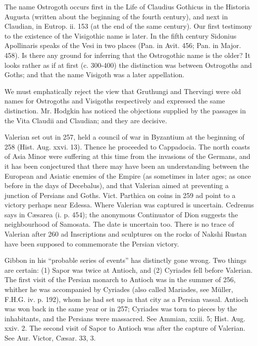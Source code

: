 The name Ostrogoth occurs first in the Life of Claudius Gothicus in the Historia Augusta (written about the beginning of the fourth century), and next in Claudian, in Eutrop. ii. 153 (at the end of the same century). Our first testimony to the existence of the Visigothic name is later. In the fifth century Sidonius Apollinaris speaks of the Vesi in two places (Pan. in Avit. 456; Pan. in Major. 458). Is there any ground for inferring that the Ostrogothic name is the older? It looks rather as if at first (c. 300-400) the distinction was between Ostrogoths and Goths; and that the name Visigoth was a later appellation.

We must emphatically reject the view that Gruthungi and Thervingi were old names for Ostrogoths and Visigoths respectively and expressed the same distinction. Mr. Hodgkin has noticed the objections supplied by the passages in the Vita Claudii and Claudian; and they are decisive.


Valerian set out in 257, held a council of war in Byzantium at the beginning of 258 (Hist. Aug. xxvi. 13). Thence he proceeded to Cappadocia. The north coasts of Asia Minor were suffering at this time from the invasions of the Germans, and it has been conjectured that there may have been an understanding between the European and Asiatic enemies of the Empire (as sometimes in later ages; as once before in the days of Decebalus), and that Valerian aimed at preventing a junction of Persians and Goths. Vict. Parthica on coins in 259 ad point to a victory perhaps near Edessa. Where Valerian was captured is uncertain. Cedrenus says in Cæsarea (i. p. 454); the anonymous Continuator of Dion suggests the neighbourhood of Samosata. The date is uncertain too. There is no trace of Valerian after 260 ad Inscriptions and sculptures on the rocks of Nakshi Rustan have been supposed to commemorate the Persian victory.

Gibbon in his \texthebrew{“}probable series of events\texthebrew{}” has distinctly gone wrong. Two things are certain: (1) Sapor was twice at Antioch, and (2) Cyriades fell before Valerian. The first visit of the Persian monarch to Antioch was in the summer of 256, whither he was accompanied by Cyriades (also called Mariades, see Müller, F.H.G. iv. p. 192), whom he had set up in that city as a Persian vassal. Antioch was won back in the same year or in 257; Cyriades was torn to pieces by the inhabitants, and the Persians were massacred. See Ammian, xxiii. 5; Hist. Aug. xxiv. 2. The second visit of Sapor to Antioch was after the capture of Valerian. See Aur. Victor, Cæsar. 33, 3.

